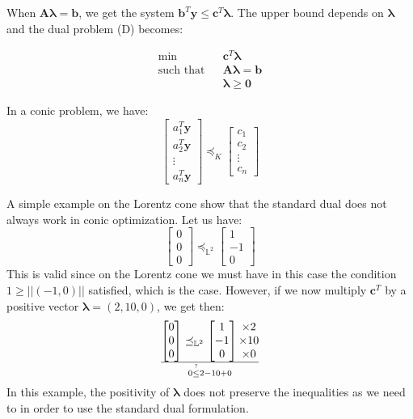When $\boldsymbol{A\lambda}=\boldsymbol{b}$, we get the system $\boldsymbol{b}^T \boldsymbol{y} \leq \boldsymbol{c}^T \boldsymbol{\lambda}$. The upper bound depends on $\boldsymbol{\lambda}$ and the dual problem (D) becomes:

\begin{eqnarray*}
\min & & \boldsymbol{c}^T \boldsymbol{\lambda}\\
\text{such that}& &\boldsymbol{A\lambda}=\boldsymbol{b}\\
             & &\boldsymbol{\lambda} \geq \boldsymbol{0}
\end{eqnarray*}

In a conic problem, we have:
\[\begin{bmatrix}
 a_1^T \boldsymbol{y}\\
 a_2^T \boldsymbol{y}\\
 \vdots\\
 a_n^T \boldsymbol{y}
\end{bmatrix} \preceq_K \begin{bmatrix}
 c_1\\
 c_2\\
 \vdots\\
 c_n
\end{bmatrix}\]

A simple example on the Lorentz cone show that the standard dual does not always work in conic optimization. Let us have:
\[\begin{bmatrix}
 0\\
 0\\
 0
\end{bmatrix} \preceq_{\mathbb{L}^2} \begin{bmatrix}
 1\\
 -1\\
 0
\end{bmatrix}\]
This is valid since on the Lorentz cone we must have in this case the condition $1\geq ||(-1,0)||$ satisfied, which is the case. However, if we now multiply $\boldsymbol{c}^T$ by a positive vector $\boldsymbol{\lambda}=(2,10,0)$, we get then:
\[\begin{bmatrix}
 0\\
 0\\
 0
\end{bmatrix} \preceq_{\mathbb{L}^2} \begin{bmatrix}
 1\\
 -1\\
 0
\end{bmatrix}\begin{matrix}
 \times 2\\
 \times 10\\
 \times 0
\end{matrix}\over
0 \stackrel{?}{\leq} 2-10+0\]
In this example, the positivity of $\boldsymbol{\lambda}$ does not preserve the inequalities as we need to in order to use the standard dual formulation.\\

